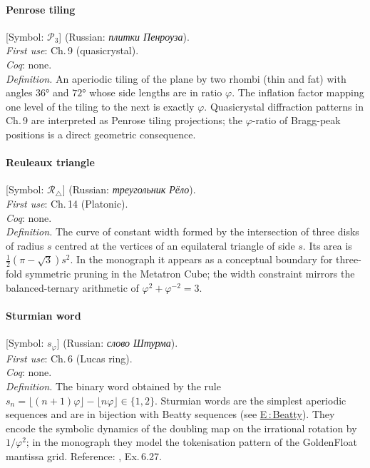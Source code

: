 \paragraph*{\textmd{\textbf{Penrose tiling}}}
\label{entry:penrose}
[Symbol: $\mathcal{P}_3$] (Russian: \textit{плитки Пенроуза}).\\
\textit{First use}: Ch.\,9 (quasicrystal).\\
\textit{Coq}: none.\\
\textit{Definition.}
An aperiodic tiling of the plane by two rhombi (thin and fat)
with angles $36°$ and $72°$ whose side lengths are in ratio $\varphi$.
The inflation factor mapping one level of the tiling to the next is
exactly $\varphi$.
Quasicrystal diffraction patterns in Ch.\,9 are interpreted as
Penrose tiling projections; the $\varphi$-ratio of Bragg-peak positions
is a direct geometric consequence.

\paragraph*{\textmd{\textbf{Reuleaux triangle}}}
\label{entry:reuleaux}
[Symbol: $\mathcal{R}_\triangle$] (Russian: \textit{треугольник Рёло}).\\
\textit{First use}: Ch.\,14 (Platonic).\\
\textit{Coq}: none.\\
\textit{Definition.}
The curve of constant width formed by the intersection of three
disks of radius $s$ centred at the vertices of an equilateral triangle
of side $s$.
Its area is $\tfrac{1}{2}(\pi - \sqrt{3})s^2$.
In the monograph it appears as a conceptual boundary for
three-fold symmetric pruning in the Metatron Cube; the width
constraint mirrors the balanced-ternary arithmetic of
$\varphi^2 + \varphi^{-2} = 3$.

\paragraph*{\textmd{\textbf{Sturmian word}}}
\label{entry:sturmian}
[Symbol: $s_{\varphi}$] (Russian: \textit{слово Штурма}).\\
\textit{First use}: Ch.\,6 (Lucas ring).\\
\textit{Coq}: none.\\
\textit{Definition.}
The binary word obtained by the rule $s_n = \lfloor (n+1)\varphi \rfloor
- \lfloor n\varphi \rfloor \in \{1,2\}$.
Sturmian words are the simplest aperiodic sequences and are in
bijection with Beatty sequences (see \hyperref[entry:beatty]{E\,:\,Beatty}).
They encode the symbolic dynamics of the doubling map on the
irrational rotation by $1/\varphi^2$; in the monograph they model the
tokenisation pattern of the GoldenFloat mantissa grid.
Reference: \cite{knuth_concrete_math}, Ex.\,6.27.

